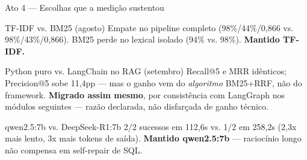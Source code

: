 \documentclass{beamer}
\newenvironment{numerobloco}[1]{\begin{block}{#1}}{\end{block}}
\begin{document}
\begin{frame}{Ato 4 --- Escolhas que a medição sustentou}
  \small
  \begin{numerobloco}{TF-IDF vs. BM25 (agosto)}
    Empate no pipeline completo (98\%/44\%/0,866 vs. 98\%/43\%/0,866). BM25 perde no
    lexical isolado (94\% vs. 98\%). \textbf{Mantido TF-IDF.}
  \end{numerobloco}

  \begin{numerobloco}{Python puro vs. LangChain no RAG (setembro)}
    Recall@5 e MRR idênticos; Precision@5 sobe 11,4pp --- mas o ganho vem do
    \emph{algoritmo} BM25+RRF, não do framework. \textbf{Migrado assim mesmo}, por
    consistência com LangGraph nos módulos seguintes --- razão declarada, não disfarçada
    de ganho técnico.
  \end{numerobloco}

  \begin{numerobloco}{qwen2.5:7b vs. DeepSeek-R1:7b}
    2/2 sucessos em 112,6s vs. 1/2 em 258,2s (2,3x mais lento, 3x mais tokens de saída).
    \textbf{Mantido qwen2.5:7b} --- raciocínio longo não compensa em self-repair de SQL.
  \end{numerobloco}
\end{frame}
\end{document}
